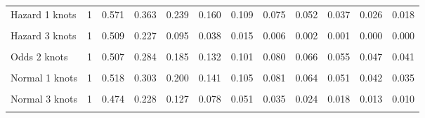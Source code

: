 \documentclass[
]{article}
\begin{document}
\begin{table}[H]
{\begin{tabular}[t]{lrrrrrrrrrrr}
Hazard 1 knots & 1 & 0.571 & 0.363 & 0.239 & 0.160 & 0.109 & 0.075 & 0.052 & 0.037 & 0.026 & 0.018\\
\cellcolor{gray!10}{Hazard 2 knots} & \cellcolor{gray!10}{1} & \cellcolor{gray!10}{0.542} & \cellcolor{gray!10}{0.297} & \cellcolor{gray!10}{0.164} & \cellcolor{gray!10}{0.091} & \cellcolor{gray!10}{0.050} & \cellcolor{gray!10}{0.028} & \cellcolor{gray!10}{0.015} & \cellcolor{gray!10}{0.009} & \cellcolor{gray!10}{0.005} & \cellcolor{gray!10}{0.003}\\
Hazard 3 knots & 1 & 0.509 & 0.227 & 0.095 & 0.038 & 0.015 & 0.006 & 0.002 & 0.001 & 0.000 & 0.000\\
\cellcolor{gray!10}{Odds 1 knots} & \cellcolor{gray!10}{1} & \cellcolor{gray!10}{0.533} & \cellcolor{gray!10}{0.326} & \cellcolor{gray!10}{0.227} & \cellcolor{gray!10}{0.171} & \cellcolor{gray!10}{0.135} & \cellcolor{gray!10}{0.111} & \cellcolor{gray!10}{0.093} & \cellcolor{gray!10}{0.080} & \cellcolor{gray!10}{0.070} & \cellcolor{gray!10}{0.062}\\
Odds 2 knots & 1 & 0.507 & 0.284 & 0.185 & 0.132 & 0.101 & 0.080 & 0.066 & 0.055 & 0.047 & 0.041\\
\cellcolor{gray!10}{Odds 3 knots} & \cellcolor{gray!10}{1} & \cellcolor{gray!10}{0.473} & \cellcolor{gray!10}{0.229} & \cellcolor{gray!10}{0.135} & \cellcolor{gray!10}{0.090} & \cellcolor{gray!10}{0.065} & \cellcolor{gray!10}{0.049} & \cellcolor{gray!10}{0.039} & \cellcolor{gray!10}{0.032} & \cellcolor{gray!10}{0.026} & \cellcolor{gray!10}{0.022}\\
Normal 1 knots & 1 & 0.518 & 0.303 & 0.200 & 0.141 & 0.105 & 0.081 & 0.064 & 0.051 & 0.042 & 0.035\\
\cellcolor{gray!10}{Normal 2 knots} & \cellcolor{gray!10}{1} & \cellcolor{gray!10}{0.514} & \cellcolor{gray!10}{0.297} & \cellcolor{gray!10}{0.193} & \cellcolor{gray!10}{0.135} & \cellcolor{gray!10}{0.100} & \cellcolor{gray!10}{0.076} & \cellcolor{gray!10}{0.059} & \cellcolor{gray!10}{0.048} & \cellcolor{gray!10}{0.039} & \cellcolor{gray!10}{0.032}\\
Normal 3 knots & 1 & 0.474 & 0.228 & 0.127 & 0.078 & 0.051 & 0.035 & 0.024 & 0.018 & 0.013 & 0.010\\
\cellcolor{gray!10}{Mixture cure Weibull} & \cellcolor{gray!10}{1} & \cellcolor{gray!10}{0.652} & \cellcolor{gray!10}{0.652} & \cellcolor{gray!10}{0.652} & \cellcolor{gray!10}{0.652} & \cellcolor{gray!10}{0.652} & \cellcolor{gray!10}{0.652} & \cellcolor{gray!10}{0.652} & \cellcolor{gray!10}{0.652} & \cellcolor{gray!10}{0.652} & \cellcolor{gray!10}{0.652}\\

\end{tabular}}
\end{table}
\end{document}
